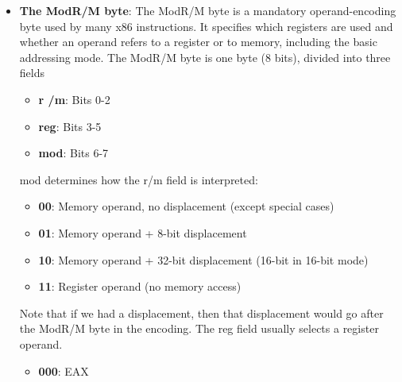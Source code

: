\documentclass{report}
\begin{document}
\begin{itemize}
            \bigbreak \noindent 
            \begin{cppcode}
                cout << "Memory at: " << (int*) prog << '\n';
            \end{cppcode}
            \bigbreak \noindent 
            Note that if we left our program pointer as char*, C++ uses the overload for outputing C-style strings. Since we just want the address of the first byte of our program, we must cast it to a different pointer, in this case a pointer to an integer. A better way to go about doing this is 
            \bigbreak \noindent 
            \begin{cppcode}
            cout << "Memory at: " << static_cast<void*>(prog) << '\n';
            \end{cppcode}
        \item \textbf{The ModR/M byte}: The ModR/M byte is a mandatory operand-encoding byte used by many x86 instructions. It specifies which registers are used and whether an operand refers to a register or to memory, including the basic addressing mode. 
            \bigbreak \noindent 
            The ModR/M byte is one byte (8 bits), divided into three fields
            \begin{itemize}
                \item \textbf{r /m}: Bits 0-2 
                \item \textbf{reg}: Bits 3-5
                \item \textbf{mod}: Bits 6-7
            \end{itemize}
            mod determines how the r/m field is interpreted:
            \begin{itemize}
                \item \textbf{00}:	Memory operand, no displacement (except special cases)
                \item \textbf{01}:	Memory operand + 8-bit displacement
                \item \textbf{10}:	Memory operand + 32-bit displacement (16-bit in 16-bit mode)
                \item \textbf{11}:	Register operand (no memory access)
            \end{itemize}
            Note that if we had a displacement, then that displacement would go after the ModR/M byte in the encoding.
            \bigbreak \noindent 
            The reg field usually selects a register operand. 
            \begin{itemize}
                \item \textbf{000}:	EAX

\end{itemize}
\end{itemize}
\end{document}
